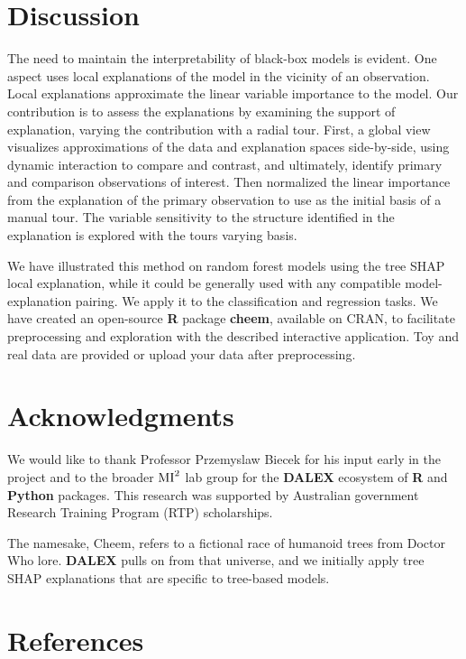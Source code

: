 \documentclass[
  article]{article}
\begin{document}
\hypertarget{sec:discussion}{%
\section{Discussion}\label{sec:discussion}}

The need to maintain the interpretability of black-box models is evident. One aspect uses local explanations of the model in the vicinity of an observation. Local explanations approximate the linear variable importance to the model. Our contribution is to assess the explanations by examining the support of explanation, varying the contribution with a radial tour. First, a global view visualizes approximations of the data and explanation spaces side-by-side, using dynamic interaction to compare and contrast, and ultimately, identify primary and comparison observations of interest. Then normalized the linear importance from the explanation of the primary observation to use as the initial basis of a manual tour. The variable sensitivity to the structure identified in the explanation is explored with the tours varying basis.

We have illustrated this method on random forest models using the tree SHAP local explanation, while it could be generally used with any compatible model-explanation pairing. We apply it to the classification and regression tasks. We have created an open-source \textbf{R} package \textbf{cheem}, available on CRAN, to facilitate preprocessing and exploration with the described interactive application. Toy and real data are provided or upload your data after preprocessing.

\hypertarget{acknowledgments}{%
\section{Acknowledgments}\label{acknowledgments}}

We would like to thank Professor Przemyslaw Biecek for his input early in the project and to the broader \(\text{MI}^\text2\) lab group for the \textbf{DALEX} ecosystem of \textbf{R} and \textbf{Python} packages. This research was supported by Australian government Research Training Program (RTP) scholarships.

The namesake, Cheem, refers to a fictional race of humanoid trees from Doctor Who lore. \textbf{DALEX} pulls on from that universe, and we initially apply tree SHAP explanations that are specific to tree-based models.

\hypertarget{references}{%
\section*{References}\label{references}}
\end{document}
